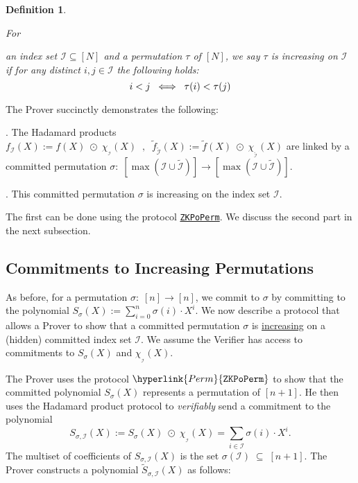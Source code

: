 \documentclass[11pt, lettersize, notitlepage, leqno, footskip=0.6cm]{article}
\newcommand{\lra}{\longrightarrow}
\newcommand{\LRA}{\Longleftrightarrow}
\newcommand{\wti}{\widetilde}
\newcommand{\mc}{\mathcal}
\newcommand{\sub}{\subseteq}
\newcommand{\vs}{\vspace{-0.15cm}}
\newcommand{\noin}{\noindent}
\newtheorem{Def}{Definition}[section]
\numberwithin{equation}{section}
\begin{document}
\begin{Def} \hypertarget{IncPerm}{For} an index set $\mc{I}\sub [N]$ and a permutation $\tau$ of $[N]$, we say $\tau$ is increasing on $\mc{I}$ if for any distinct $i,j\in \mc{I}$ the following holds: \vs $$ i<j \;\;\LRA\;\; \tau(i) < \tau(j) \vs $$ \end{Def}

The Prover succinctly demonstrates the following: \vspace{2mm}

\noin 1. The Hadamard products $ f_{\mc{I}}(X) := f(X)\;\odot\; \chi_{_{\mc{I}}}(X)\;\;,\;\; \wti{f}_{\wti{\mc{I}}}(X) := \wti{f}(X)\;\odot\; \chi_{_{\wti{\mc{I}}}}(X) $ are linked by a committed permutation $\sigma:\;[ \max(\mc{I}\cup \wti{\mc{I}})]\lra [ \max(\mc{I}\cup \wti{\mc{I}})]$. \vspace{1mm}

\noin 2. This committed permutation $\sigma$ is increasing on the index set $\mc{I}$. \vspace{2mm}

The first can be done using the protocol \hyperlink{Perm}{\tt{ZKPoPerm}}. We discuss the second part in the next subsection.


\subsection{\fontsize{11}{11}\selectfont Commitments to Increasing Permutations}

As before, for a permutation $\sigma:\;[n]\lra [n]$, we commit to $\sigma$ by committing to the polynomial $S_{\sigma}(X):= \sum_{i=0}^n \sigma(i)\cdot X^i .$ We now describe a \hypertarget{Perm^}{protocol} that allows a Prover to show that a committed permutation $\sigma$ is \hyperlink{IncPerm}{increasing} on a (hidden) committed index set $\mc{I}$. We assume the Verifier has access to commitments to $S_{\sigma}(X)$ and $\chi_{_{\mc{I}}}(X)$. 

The Prover uses the protocol $\hyperlink{Perm}{\tt{ZKPoPerm}}$ to show that the committed polynomial $S_{\sigma}(X)$ represents a permutation of $[n+1]$. He then uses the Hadamard product protocol to \textit{verifiably} send a commitment to the polynomial \vs $$ S_{\sigma,\mc{I}}(X):= S_{\sigma}(X)\;\odot\; \chi_{_{\mc{I}}}(X) = \sum\limits_{i\in\mc{I}} \sigma(i)\cdot X^i. $$ The multiset of coefficients of $S_{\sigma,\mc{I}}(X)$ is the set $\sigma(\mc{I})\;\sub\; [n+1]$. The Prover constructs a polynomial $\wti{S}_{\sigma,\mc{I}}(X)$ as follows: \vspace{2mm}
\end{document}
